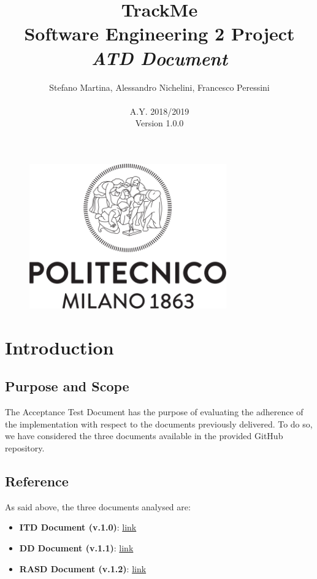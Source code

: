 \documentclass{article}
\begin{document}
\begin{figure}[t]
\centering
	\includegraphics[height=6.25cm,keepaspectratio]{Figures/logo}
\end{figure}

\title{TrackMe \\ Software Engineering 2 Project\\ \textit{ATD Document} }
\author{Stefano Martina, Alessandro Nichelini, Francesco Peressini
		\\ \\ A.Y. 2018/2019 \\ Version 1.0.0}
		
\maketitle
\newpage

\tableofcontents
\newpage

\section{Introduction}

\subsection{Purpose and Scope} 
The Acceptance Test Document has the purpose of evaluating the adherence of the implementation with respect to the  documents previously delivered. \newline
To do so, we have considered the three documents available in the provided GitHub repository.

\subsection{Reference} 
	As said above, the three documents analysed are:
	\begin{itemize}
		\item \textbf{ITD Document (v.1.0)}: \href{https://github.com/danmontesi/FossatiMontesiSgherzi/blob/master/delivery/ITD.pdf}{link}
		\item \textbf{DD Document (v.1.1)}: \href{https://github.com/danmontesi/FossatiMontesiSgherzi/blob/master/delivery/DD2.pdf}{link} 
		\item \textbf{RASD Document (v.1.2)}: \href{https://github.com/danmontesi/FossatiMontesiSgherzi/blob/master/delivery/RASD3.pdf}{link}
	\end{itemize}
	
\end{document}
